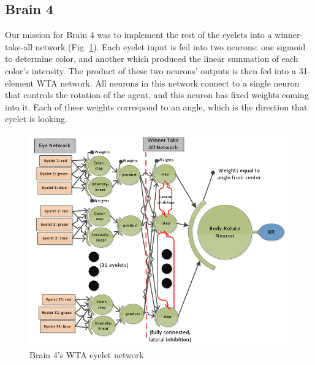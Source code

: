 \subsection{Brain 4}

Our mission for Brain 4 was to implement the rest of the eyelets into a
winner-take-all network (Fig. \ref{fig:brain4}). Each eyelet input is fed 
into two neurons: one sigmoid to determine color, and another which produced 
the linear summation of each color's intensity. The product of these two 
neurons' outputs is then fed into a 31-element WTA network. All neurons in 
this network connect to a single neuron that controls the rotation of the 
agent, and this neuron has fixed weights coming into it. Each of these weights
correspond to an angle, which is the direction that eyelet is looking.

\begin{figure}
\begin{center}
  \includegraphics[scale=.5]{img/brain4.png}
  \caption{Brain 4's WTA eyelet network}
  \label{fig:brain4}
\end{center}
\end{figure}
